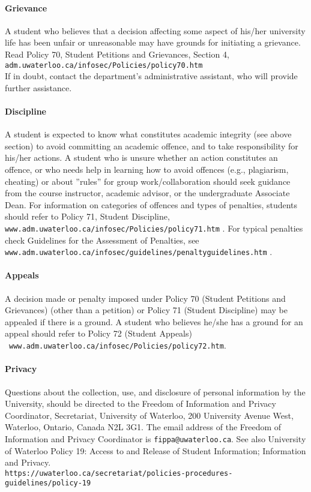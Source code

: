 \documentclass[letterpaper,10pt]{article}
\begin{document}
\paragraph{Grievance}
A student who believes that a decision affecting some aspect of his/her university life has been unfair or unreasonable may have grounds for initiating a grievance. Read Policy 70, Student Petitions and Grievances, Section 4, \texttt{adm.uwaterloo.ca/infosec/Policies/policy70.htm} \\
If in doubt, contact the department's administrative assistant, who will provide further assistance.

\paragraph{Discipline}
A student is expected to know what constitutes academic integrity (see above section) to avoid committing an academic offence, and to take responsibility for his/her actions. A student who is unsure whether an action constitutes an offence, or who needs help in learning how to avoid offences (e.g., plagiarism, cheating) or about ''rules'' for group work/collaboration should seek guidance from the course instructor, academic advisor, or the undergraduate Associate Dean. For information on categories of offences and types of penalties, students should refer to Policy 71, Student Discipline, \texttt{www.adm.uwaterloo.ca/infosec/Policies/policy71.htm} . For typical penalties check Guidelines for the Assessment of Penalties, see \\\texttt{www.adm.uwaterloo.ca/infosec/guidelines/penaltyguidelines.htm} .

\paragraph{Appeals}
A decision made or penalty imposed under Policy 70 (Student Petitions and Grievances) (other than a petition) or Policy 71 (Student Discipline) may be appealed if there is a ground. A student who believes he/she has a ground for an appeal should refer to Policy 72 (Student Appeals)\\~\texttt{www.adm.uwaterloo.ca/infosec/Policies/policy72.htm}.

\paragraph{Privacy}
Questions about the collection, use, and disclosure of personal information by the University, should be directed to the Freedom of Information and Privacy Coordinator, Secretariat, University of Waterloo, 200 University Avenue West, Waterloo, Ontario, Canada N2L 3G1. The email address of the Freedom of Information and Privacy Coordinator is \texttt{fippa@uwaterloo.ca}. See also University of Waterloo Policy 19: Access to and Release of Student Information; Information and Privacy.
\\ \texttt{https://uwaterloo.ca/secretariat/policies-procedures-guidelines/policy-19}
\end{document}
